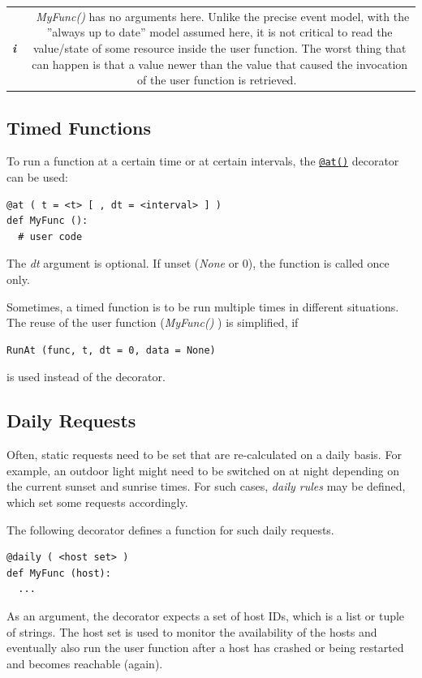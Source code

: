 \documentclass[12pt,english,parskip=half,headheight=19pt]{scrreprt}
\newcommand{\infobox}[1]{
  \par
  \medskip
  \hfill
  \setlength\arrayrulewidth{1pt}
  \begin{tabular}[t]{c|c|}
    \parbox{1.8em}{\hfill\textit{\Huge\textbf{i}\,}}
    &
    \,\parbox{0.89\linewidth}{\setlength{\parskip}{0.5em} \small #1}\,
  \end{tabular}
  \medskip
  \par
}
\newcommand{\refapipython}[1]{\href{home2l-api_python/index.html}{\mbox{\texttt{#1}}}}  %
\begin{document}
\infobox{
  \textit{MyFunc()} has no arguments here. Unlike the precise event model, with the
  ''always up to date'' model assumed here, it is not critical to read the value/state
  of some resource inside the user function. The worst thing that can happen is that
  a value newer than the value that caused the invocation of the user function is
  retrieved.
}



\subsection{Timed Functions}

To run a function at a certain time or at certain intervals, the \refapipython{@at()} decorator can be used:
\begin{lstlisting}
@at ( t = <t> [ , dt = <interval> ] )
def MyFunc ():
  # user code
\end{lstlisting}

The \textit{dt} argument is optional. If unset (\textit{None} or 0), the function is called once only.

Sometimes, a timed function is to be run multiple times in different situations.
The reuse of the user function (\textit{MyFunc()} ) is simplified, if
\begin{lstlisting}
RunAt (func, t, dt = 0, data = None)
\end{lstlisting}

is used instead of the decorator.



\subsection{Daily Requests}

Often, static requests need to be set that are re-calculated on a daily basis. For example, an outdoor light might need to be switched on at night depending on the current sunset and sunrise times. For such cases, \textit{daily rules} may be defined, which set some requests accordingly.

The following decorator defines a function for such daily requests.
\begin{lstlisting}
@daily ( <host set> )
def MyFunc (host):
  ...
\end{lstlisting}

As an argument, the decorator expects a set of host IDs, which is a list or tuple of strings. The host set is used to monitor the availability of the hosts and eventually also run the user function after a host has crashed or being restarted and becomes reachable (again).
\end{document}
